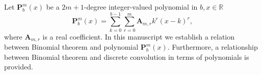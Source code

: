 Let $\mathbf{P}^{m}_{b}(x)$ be a $2m+1$-degree integer-valued polynomial in $b,x\in\mathbb{R}$
\[
    \mathbf{P}^{m}_{b}(x) = \sum_{k=0}^{b-1} \sum_{r=0}^{m} \mathbf{A}_{m,r} k^r(x-k)^r,
\]
where $\mathbf{A}_{m,r}$ is a real coefficient.
In this manuscript we establish a relation between Binomial theorem and polynomial $\mathbf{P}^{m}_{b}(x)$.
Furthermore, a relationship between Binomial theorem and discrete convolution in terms of polynomials is provided.
